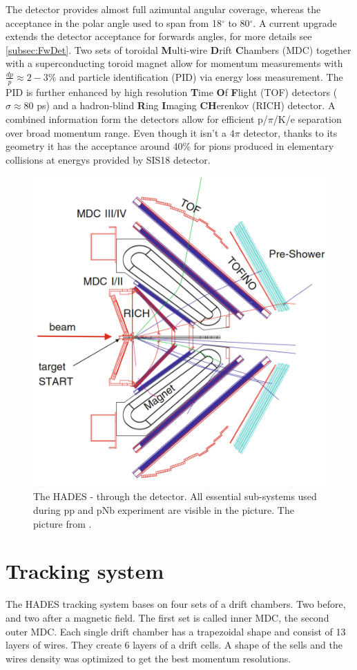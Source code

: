 The detector provides almost full azimuntal angular coverage, whereas the acceptance in the polar angle used to span from 18$^{\circ}$  to 80$^{\circ}$. A current upgrade extends the detector acceptance for forwards angles, for more details see \ref{subsec:FwDet}. Two sets of toroidal \textbf{M}ulti-wire \textbf{D}rift \textbf{C}hambers (MDC) together with a superconducting toroid magnet allow for momentum measurements with $\frac{dp}{p} \approx 2-3\%$ and particle identification (PID) via energy loss measurement. The PID is further enhanced by high resolution \textbf{T}ime \textbf{O}f \textbf{F}light (TOF) detectors ($\sigma \approx 80$ ps) and a hadron-blind \textbf{R}ing \textbf{I}maging \textbf{CH}erenkov (RICH) detector. A combined information form the detectors allow for efficient p/$\pi$/K/e separation over broad momentum range. Even though it isn't a $4 \pi$ detector, thanks to its geometry it has the acceptance around 40\% for pions produced in elementary collisions at energys provided by SIS18 detector.
\begin{figure}
  \centering
  \includegraphics[width=0.7 \linewidth]{Chapter_detector/detektor.eps}
  \caption{The HADES - \cs through the detector. All essential sub-systems used during pp and pNb experiment are visible in the picture. The picture from \cite{Agakishiev:2009am}.}
\end{figure}


\section{Tracking system}
The HADES tracking system bases on four sets of a drift chambers. Two before, and two after a magnetic field. The first set is called inner MDC, the second outer MDC. Each single drift chamber has a trapezoidal shape and consist of 13 layers of wires. They create 6 layers of a drift cells. A shape of the sells and the wires density was optimized to get the best momentum resolutions.

